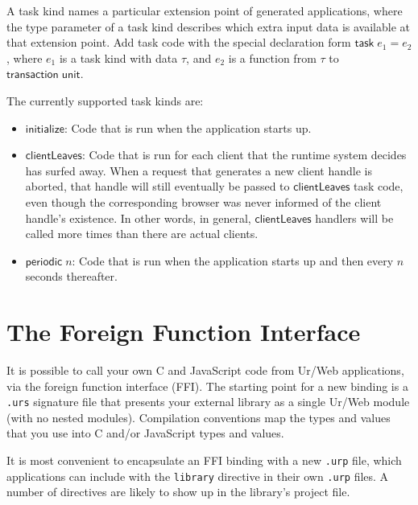 \documentclass{article}
\newcommand{\mt}[1]{\mathsf{#1}}
\begin{document}
A task kind names a particular extension point of generated applications, where the type parameter of a task kind describes which extra input data is available at that extension point.  Add task code with the special declaration form $\mt{task} \; e_1 = e_2$, where $e_1$ is a task kind with data $\tau$, and $e_2$ is a function from $\tau$ to $\mt{transaction} \; \mt{unit}$.

The currently supported task kinds are:
\begin{itemize}
\item $\mt{initialize}$: Code that is run when the application starts up.
\item $\mt{clientLeaves}$: Code that is run for each client that the runtime system decides has surfed away.  When a request that generates a new client handle is aborted, that handle will still eventually be passed to $\mt{clientLeaves}$ task code, even though the corresponding browser was never informed of the client handle's existence.  In other words, in general, $\mt{clientLeaves}$ handlers will be called more times than there are actual clients.
\item $\mt{periodic} \; n$: Code that is run when the application starts up and then every $n$ seconds thereafter.
\end{itemize}


\section{\label{ffi}The Foreign Function Interface}

It is possible to call your own C and JavaScript code from Ur/Web applications, via the foreign function interface (FFI).  The starting point for a new binding is a \texttt{.urs} signature file that presents your external library as a single Ur/Web module (with no nested modules).  Compilation conventions map the types and values that you use into C and/or JavaScript types and values.

It is most convenient to encapsulate an FFI binding with a new \texttt{.urp} file, which applications can include with the \texttt{library} directive in their own \texttt{.urp} files.  A number of directives are likely to show up in the library's project file.
\end{document}
